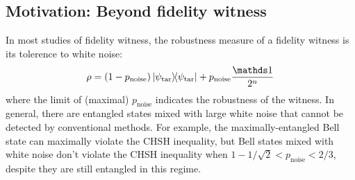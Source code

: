 \documentclass[
aps,
pra,
twocolumn,
floatfix,
]{revtex4-2}
\theoremstyle{plain}
\newtheorem{theorem}{Theorem}
\theoremstyle{definition}
\newcommand{\dm}{\rho}
\newcommand{\ghz}{\text{GHZ}}
\newcommand{\target}{\textup{tar}}
\newcommand{\noise}{\text{noise}}
\newcommand{\D}{\mathcal{D}}
\begin{document}
\subsection{Motivation: Beyond fidelity witness}
In most studies of fidelity witness, the robustness measure of a fidelity witness is its tolerence to white noise:
\begin{equation}\label{eq:white_noise}
	\dm
	= (1-p_{\noise}) \op{\psi_{\target}} + p_{\noise} \frac{\identity}{2^{n}}
\end{equation}
where the limit of (maximal) $p_{\noise}$ indicates the robustness of the witness.
In general, there are entangled states mixed with large white noise that cannot be detected by conventional methods.
For example, the maximally-entangled Bell state can maximally violate the CHSH inequality, 
but Bell states mixed with white noise don't violate the CHSH inequality when $ 1- 1/ \sqrt{2} < p_{\noise}<2/3 $, despite they are still entangled in this regime.
\end{document}
